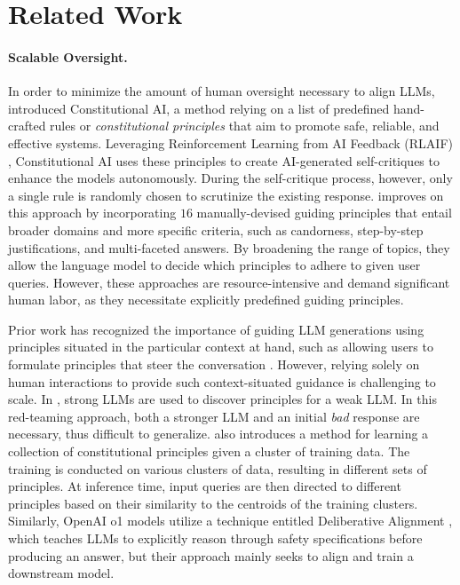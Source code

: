 \section{Related Work}
\paragraph{Scalable Oversight.} In order to minimize the amount of human oversight necessary to align LLMs, \citet{bai2022constitutional} introduced Constitutional AI, a method relying on a list of predefined hand-crafted rules or \emph{constitutional principles} that aim to promote safe, reliable, and effective systems. Leveraging Reinforcement Learning from AI Feedback (RLAIF) \cite{Lee2024RLAIFVR}, Constitutional AI uses these principles to create AI-generated self-critiques to enhance the models autonomously. During the self-critique process, however, only a single rule is randomly chosen to scrutinize the existing response. \citet{sun2023principledriven} improves on this approach by incorporating $16$ manually-devised guiding principles that entail broader domains and more specific criteria, such as candorness, step-by-step justifications, and multi-faceted answers. By broadening the range of topics, they allow the language model to decide which principles to adhere to given user queries. However, these approaches are resource-intensive and demand significant human labor, as they necessitate explicitly predefined guiding principles.

Prior work has recognized the importance of guiding LLM generations using principles situated in the particular context at hand, such as allowing users to formulate principles that steer the conversation \cite{ConstitutionMaker-2024}. However, relying solely on human interactions to provide such context-situated guidance is challenging to scale. In \citet{chen-etal-2024-iteralign}, strong LLMs are used to discover principles for a weak LLM. In this red-teaming approach, both a stronger LLM and an initial \emph{bad} response are necessary, thus difficult to generalize. \citet{petridis-etal-2024-constitutionalexperts} also introduces a method for learning a collection of constitutional principles given a cluster of training data. The training is conducted on various clusters of data, resulting in different sets of principles. At inference time, input queries are then directed to different principles based on their similarity to the centroids of the training clusters. Similarly,  OpenAI o1 models \cite{openai2024openaio1card} utilize a technique entitled Deliberative Alignment \citep{guan2025deliberativealignmentreasoningenables}, which teaches LLMs to explicitly reason through safety specifications before producing an answer, but their approach mainly seeks to align and train a downstream model.

